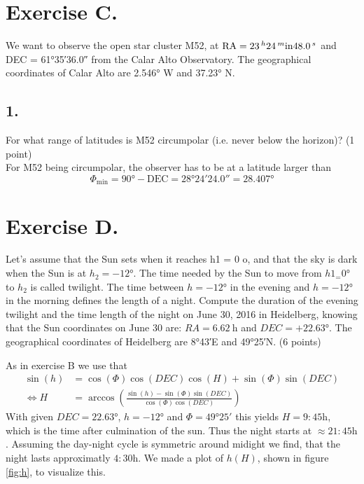 \documentclass[11pt,a4paper,twoside]{article}
\newcommand{\op}[1]{\operatorname{#1}}
\begin{document}
\section*{Exercise C.}

We want to observe the open star cluster M52, at $ \text{RA} = \SI{23}{^\hour} \SI{24}{^\minute} \SI{48.0}{^\second}$ and DEC = \ang{61;35;36.0} from the Calar Alto Observatory. The geographical coordinates of Calar Alto are \ang{2.546} W and \ang{37.23} N.

\subsection*{1.} For what range of latitudes is M52 circumpolar (i.e. never below the horizon)? (1 point) \\

For M52 being circumpolar, the observer has to be at a latitude larger than 
\begin{equation}
 \Phi_{\text{min}} = \ang{90} - \text{DEC} = \ang{28;24;24.0} = \ang{28.407}
\end{equation}

\section*{Exercise D.}

Let's assume that the Sun sets when it reaches h1 = 0 o, and that the sky is
dark when the Sun is at $h_2 = \ang{-12}$. The time needed by the Sun to 
move from $h1_ = \ang{0}$ to $h_2$ is called twilight. The time between 
$h = \ang{-12}$ in the evening and $h = \ang{-12}$ in the 
morning defines the length of a night.
Compute the duration of the evening twilight and the time length of the night 
on June 30, 2016 in Heidelberg, knowing that the Sun coordinates on June 30 
are: $RA = \SI{6.62}{\hour}$ and $DEC = +\ang{22.63}.$
The geographical coordinates of Heidelberg are \ang{8;43;}E and \ang{49;25;}N. (6 points)

As in exercise B we use that 
\begin{align}
    \op{sin}(h) &=  \op{cos}(\Phi)\op{cos}(DEC)\op{cos}(H) + 
                    \op{sin}(\Phi)\op{sin}(DEC) \\
    \Leftrightarrow H &=   \op{arccos} \left(
                            \frac{\op{sin}(h) - \op{sin}(\Phi)\op{sin}(DEC)}
                                 {\op{cos}(\Phi)\op{cos}(DEC)} \right)
\end{align}
With given $DEC = \ang{22.63}$, $h = \ang{-12}$ and $\Phi = \ang{49;25;}$ 
this yields $H = 9:45\si{\hour}$, which is the time after culmination of the 
sun. Thus the night starts at $\approx 21:45\si{\hour}$. Assuming the day-night 
cycle is symmetric around midight we find, that the night lasts approximatly
$4:30 \si{\hour}$. We made a plot of $h(H)$, shown in figure \ref{fig:h}, 
to visualize this.
\end{document}
